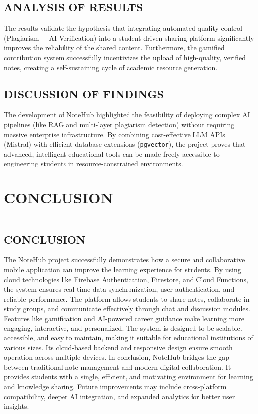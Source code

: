 \documentclass[12,Times new Roman,a4paper]{report}
\begin{document}
\section{ANALYSIS OF RESULTS}
The results validate the hypothesis that integrating automated quality control (Plagiarism + AI Verification) into a student-driven sharing platform significantly improves the reliability of the shared content. Furthermore, the gamified contribution system successfully incentivizes the upload of high-quality, verified notes, creating a self-sustaining cycle of academic resource generation.

\section{DISCUSSION OF FINDINGS}
The development of NoteHub highlighted the feasibility of deploying complex AI pipelines (like RAG and multi-layer plagiarism detection) without requiring massive enterprise infrastructure. By combining cost-effective LLM APIs (Mistral) with efficient database extensions (\texttt{pgvector}), the project proves that advanced, intelligent educational tools can be made freely accessible to engineering students in resource-constrained environments.
\chapter{CONCLUSION}
 \rule{\textwidth}{1pt}
\paragraph{}
\section{CONCLUSION}
The NoteHub project successfully demonstrates how a secure and collaborative mobile application can improve the learning experience for students. By using cloud technologies like Firebase Authentication, Firestore, and Cloud Functions, the system ensures real-time data synchronization, user authentication, and reliable performance.
\vspace{0.5 cm}
The platform allows students to share notes, collaborate in study groups, and communicate effectively through chat and discussion modules. Features like gamification and AI-powered career guidance make learning more engaging, interactive, and personalized.
\vspace{0.5 cm}
The system is designed to be scalable, accessible, and easy to maintain, making it suitable for educational institutions of various sizes. Its cloud-based backend and responsive design ensure smooth operation across multiple devices.
\vspace{0.5 cm}
In conclusion, NoteHub bridges the gap between traditional note management and modern digital collaboration. It provides students with a single, efficient, and motivating environment for learning and knowledge sharing. Future improvements may include cross-platform compatibility, deeper AI integration, and expanded analytics for better user insights.
\newpage
\end{document}
